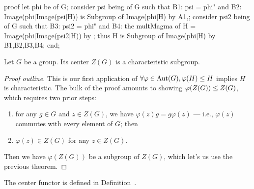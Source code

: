 \nwenddocs{}\endmoddef\nwstartdeflinemarkup{}\nwenddeflinemarkup
proof
  let phi be  of G;
  consider psi being  of G such that
  B1: psi = phi" and
  B2: Image(phi|Image(psi|H)) is Subgroup of Image(phi|H) by A1,;
  consider psi2 being  of G such that
  B3: psi2 = phi" and
  B4: the multMagma of H = Image(phi|Image(psi2|H)) by ;
  thus H is Subgroup of Image(phi|H) by B1,B2,B3,B4;
end;
\nwendcode{}\nwdocspar


\begin{theorem}
Let $G$ be a group. Its center $Z(G)$ is a characteristic subgroup.
\end{theorem}

\begin{proof}[Proof outline]
This is our first application of
$\forall\varphi\in\operatorname{Aut}(G),\varphi(H)\leq H$ implies $H$ is characteristic.
The bulk of the proof amounts to showing $\varphi(Z(G))\leq Z(G)$,
which requires two prior steps:
\begin{enumerate}
\item for any $g\in G$ and $z\in Z(G)$, we have $\varphi(z)g =
  g\varphi(z)$ --- i.e., $\varphi(z)$ commutes with every element of
  $G$; then
\item $\varphi(z)\in Z(G)$ for any $z\in Z(G)$.
\end{enumerate}
Then we have $\varphi(Z(G))$ be a subgroup of $Z(G)$, which let's us use
the previous theorem.
\end{proof}

\begin{thm-remark}
The {\Tt{}center\nwendquote} functor is defined in
Definition~.
\end{thm-remark}

